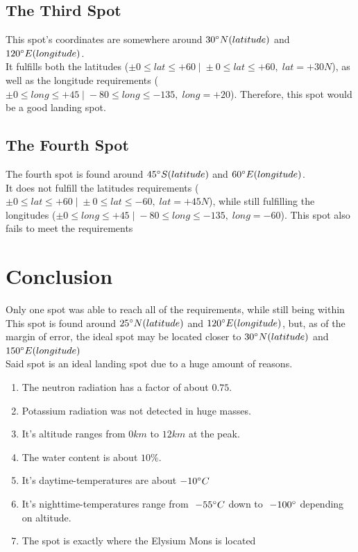 \documentclass{article}
\begin{document}
\subsection{The Third Spot}
This spot's coordinates are somewhere around \(30 \degree N (latitude)\) and \(120 \degree E (longitude)\). \\
It fulfills both the latitudes (\(\pm 0 \leq lat \leq +60 \;|\; \pm 0 \leq lat \leq +60,\; lat = +30 N\)), as well as the longitude requirements (\(  \pm 0 \leq long \leq +45 \;|\; -80 \leq long \leq -135,\; long = +20 \)).
Therefore, this spot would be a good landing spot.

\subsection{The Fourth Spot}
The fourth spot is found around \(45 \degree S (latitude)\) and \(60 \degree E (longitude)\). \\
It does not fulfill the latitudes requirements (\(\pm 0 \leq lat \leq +60 \;|\; \pm 0 \leq lat \leq -60,\; lat = +45 N\)), while still fulfilling the longitudes (\(  \pm 0 \leq long \leq +45 \;|\; -80 \leq long \leq -135,\; long = -60 \)).
This spot also fails to meet the requirements

\section{Conclusion}
Only one spot was able to reach all of the requirements, while still being within
This spot is found around \(25 \degree N (latitude)\) and \(120 \degree E (longitude)\), but, as of the margin of error, the ideal spot may be located closer to \(30 \degree N (latitude)\) and \(150 \degree E (longitude)\)  \\
Said spot is an ideal landing spot due to a huge amount of reasons.
\begin{enumerate}
    \item The neutron radiation has a factor of about \(0.75\). \\
    \item Potassium radiation was not detected in huge masses.
    \item It's altitude ranges from \(0km\) to \(12km\) at the peak.
    \item The water content is about \(10\%\).
    \item It's daytime-temperatures are about \(-10 \degree C\)
    \item It's nighttime-temperatures range from \(~-55 \degree C\) down to \(~-100 \degree\) depending on altitude. 
    \item The spot is exactly where the Elysium Mons is located
\end{enumerate}
\end{document}
